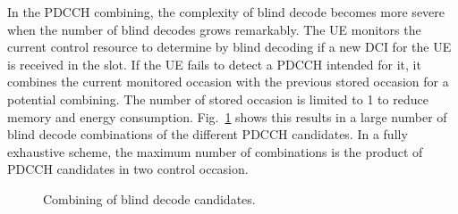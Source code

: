 \documentclass[conference]{IEEEtran}
\begin{document}
In the PDCCH combining, the complexity of blind decode becomes more severe when the number of blind decodes grows remarkably. The UE monitors the current control resource to determine by blind decoding if a new DCI for the UE is received in the slot. If the UE fails to detect a PDCCH intended for it, it combines the current monitored occasion with the previous stored occasion for a potential combining. The number of stored occasion is limited to 1 to reduce memory and energy consumption. Fig.~\ref{fig4} shows this results in a large number of blind decode combinations of the different PDCCH candidates. In a fully exhaustive scheme, the maximum number of combinations is the product of PDCCH candidates in two control occasion. 

\begin{figure}[htbp]
\centering
{}
\hfill
\qquad
{}
\hfill

\caption{Combining of blind decode candidates.}
\label{fig4}
\end{figure}
\end{document}
